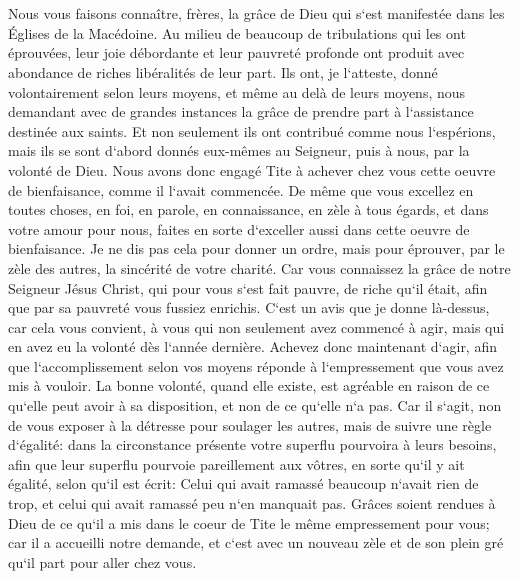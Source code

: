 \chapter{}

\verse Nous vous faisons connaître, frères, la grâce de Dieu qui s`est manifestée dans les Églises de la Macédoine. 
\verse Au milieu de beaucoup de tribulations qui les ont éprouvées, leur joie débordante et leur pauvreté profonde ont produit avec abondance de riches libéralités de leur part. 
\verse Ils ont, je l`atteste, donné volontairement selon leurs moyens, et même au delà de leurs moyens, 
\verse nous demandant avec de grandes instances la grâce de prendre part à l`assistance destinée aux saints. 
\verse Et non seulement ils ont contribué comme nous l`espérions, mais ils se sont d`abord donnés eux-mêmes au Seigneur, puis à nous, par la volonté de Dieu. 
\verse Nous avons donc engagé Tite à achever chez vous cette oeuvre de bienfaisance, comme il l`avait commencée. 
\verse De même que vous excellez en toutes choses, en foi, en parole, en connaissance, en zèle à tous égards, et dans votre amour pour nous, faites en sorte d`exceller aussi dans cette oeuvre de bienfaisance. 
\verse Je ne dis pas cela pour donner un ordre, mais pour éprouver, par le zèle des autres, la sincérité de votre charité. 
\verse Car vous connaissez la grâce de notre Seigneur Jésus Christ, qui pour vous s`est fait pauvre, de riche qu`il était, afin que par sa pauvreté vous fussiez enrichis. 
\verse C`est un avis que je donne là-dessus, car cela vous convient, à vous qui non seulement avez commencé à agir, mais qui en avez eu la volonté dès l`année dernière. 
\verse Achevez donc maintenant d`agir, afin que l`accomplissement selon vos moyens réponde à l`empressement que vous avez mis à vouloir. 
\verse La bonne volonté, quand elle existe, est agréable en raison de ce qu`elle peut avoir à sa disposition, et non de ce qu`elle n`a pas. 
\verse Car il s`agit, non de vous exposer à la détresse pour soulager les autres, mais de suivre une règle d`égalité: dans la circonstance présente votre superflu pourvoira à leurs besoins, 
\verse afin que leur superflu pourvoie pareillement aux vôtres, en sorte qu`il y ait égalité, 
\verse selon qu`il est écrit: Celui qui avait ramassé beaucoup n`avait rien de trop, et celui qui avait ramassé peu n`en manquait pas. 
\verse Grâces soient rendues à Dieu de ce qu`il a mis dans le coeur de Tite le même empressement pour vous; 
\verse car il a accueilli notre demande, et c`est avec un nouveau zèle et de son plein gré qu`il part pour aller chez vous. 
